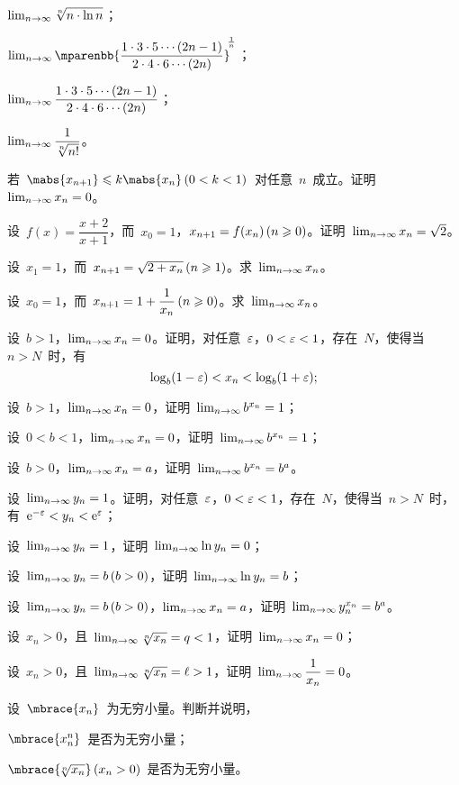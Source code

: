 \begin{exercise}
\begin{exlistcols}
  \item $\lim_{n\to\infty}\sqrt[n]{n\cdot\ln n}$；
  \item $\lim_\ntoinf\mparenbb{\dfrac{1\cdot3\cdot5\dotsm(2n-1)}{2\cdot4\cdot6\dotsm(2n)}}^{\msp\frac1n}$；
  \item $\lim_{n\to\infty}\dfrac{1\cdot3\cdot5\dotsm(2n-1)}{2\cdot4\cdot6\dotsm(2n)}$；
  \item $\lim_{n\to\infty}\dfrac1{\sqrt[n]{n!}}$。
\end{exlistcols}
\item 若~$\mabs{x_{n+1}}\leq k\mabs{x_n}\mcond{0<k<1}$~对任意~$n$~成立。证明~$\lim_{n\to\infty} x_n=0$。
\item 设~$f(x)=\dfrac{x+2}{x+1}$，而~$x_0=1$，$x_{n+1}=f(x_n)\mcond{n\geq0}$。证明~$\lim_{n\to\infty} x_n=\sqrt2$。
\item 设~$x_1=1$，而~$x_{n+1}=\sqrt{2+x_n}\mcond{n\geq1}$。求~$\lim_{n\to\infty} x_n$。
\item 设~$x_0=1$，而~$x_{n+1}=1+\dfrac1{x_n}\mcond{n\geq0}$。求~$\lim_{n\to\infty} x_n$。
\item\begin{exlist}
  \item 设~$b>1$，$\lim_{n\to\infty} x_n=0$。证明，对任意~$\varepsilon$，$0<\varepsilon<1$，存在~$N$，使得当~$n>N$~时，有
  \[
    \log_b(1-\varepsilon)<x_n<\log_b(1+\varepsilon);
  \]
  \item 设~$b>1$，$\lim_{n\to\infty} x_n=0$，证明~$\lim_{n\to\infty} b^{x_n}=1$；
  \item 设~$0<b<1$，$\lim_{n\to\infty} x_n=0$，证明~$\lim_{n\to\infty} b^{x_n}=1$；
  \item 设~$b>0$，$\lim_{n\to\infty} x_n=a$，证明~$\lim_{n\to\infty} b^{x_n}=b^a$。
\end{exlist}
\item\begin{exlist}
  \item 设~$\lim_{n\to\infty} y_n=1$。证明，对任意~$\varepsilon$，$0<\varepsilon<1$，存在~$N$，使得当~$n>N$~时，有~$\mathrm e^{-\varepsilon}<y_n<\mathrm e^\varepsilon$；
  \item 设~$\lim_{n\to\infty} y_n=1$，证明~$\lim_{n\to\infty}\ln y_n=0$；
  \item 设~$\lim_\ntoinf y_n=b\mcond{b>0}$，证明~$\lim_{n\to\infty}\ln y_n=b$；
  \item 设~$\lim_\ntoinf y_n=b\mcond{b>0}$，$\lim_{n\to\infty} x_n=a$，证明~$\lim_{n\to\infty} y_n^{x_n}=b^a$。
\end{exlist}
\item\begin{exlist}
  \item 设~$x_n>0$，且~$\lim_{n\to\infty}\sqrt[n]{x_n}=q<1$，证明~$\lim_{n\to\infty} x_n=0$；
  \item 设~$x_n>0$，且~$\lim_{n\to\infty}\sqrt[n]{x_n}=\ell>1$，证明~$\lim_{n\to\infty}\dfrac1{x_n}=0$。
\end{exlist}
\item 设~$\mbrace{x_n}$~为无穷小量。判断并说明，
\begin{exlistcols}
  \item $\mbrace{x_n^n}$~是否为无穷小量；
  \item $\mbrace{\!\sqrt[n]{x_n}}\mcond{x_n>0}$~是否为无穷小量。
\end{exlistcols}
\end{exercise}


